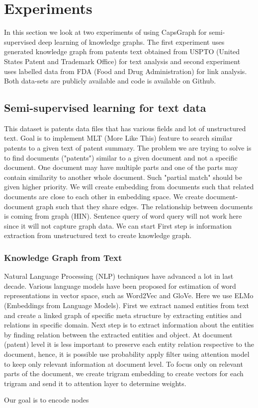 \section{Experiments} 
In this section we look at two experiments of using CapsGraph for semi-supervised deep learning of knowledge graphs. The first experiment uses generated knowledge graph from patents text obtained from USPTO (United States Patent and Trademark Office) for text analysis and second experiment uses labelled data from FDA (Food and Drug Administration) for link analysis. Both data-sets are publicly available and code is available on Github.
\subsection{Semi-supervised learning for text data}
This dataset is patents data files that has various fields and lot of unstructured text. Goal is to implement MLT (More Like This) feature to search similar patents to a given text of patent summary. The problem we are trying to solve is to find documents ("patents") similar to a given document and not a specific document. One document may have multiple parts and one of the parts may contain similarity to another whole document. Such "partial match" should be given higher priority. We will create embedding from documents such that related documents are close to each other in embedding space. We create document-document graph such that they share edges. The relationship between documents is coming from graph (HIN). Sentence query of word query will not work here since it will not capture graph data. We can start First step is information extraction from unstructured text to create knowledge graph.

\subsubsection{Knowledge Graph from Text} 
Natural Language Processing (NLP) techniques have advanced a lot in last decade. Various language models have been proposed for estimation of word representations in vector space, such as Word2Vec\cite{mikolov2013efficient} and GloVe\cite{Pennington2014GloveGV}. Here we use ELMo (Embeddings from Language Models)\cite{Peters_2018}. First we extract named entities from text and create a linked graph of specific meta structure by extracting entities and relations in specific domain. Next step is to extract information about the entities by finding relation between the extracted entities and object. At document (patent) level it is less important to preserve each entity relation respective to the document, hence, it is possible use probability apply filter using attention model to keep only relevant information at document level. To focus only on relevant parts of the document, we create trigram embedding to create vectors for each trigram and send it to attention layer to determine weights. 
\par Our goal is to encode nodes

